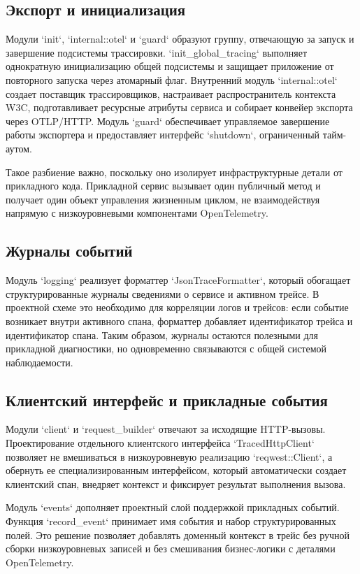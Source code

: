 \subsection{Экспорт и инициализация}

Модули `init`, `internal::otel` и `guard` образуют группу, отвечающую за запуск и
завершение подсистемы трассировки. `init_global_tracing` выполняет однократную
инициализацию общей подсистемы и защищает приложение от повторного запуска через
атомарный флаг. Внутренний модуль `internal::otel` создает поставщик
трассировщиков, настраивает распространитель контекста W3C, подготавливает
ресурсные атрибуты сервиса и собирает конвейер экспорта через OTLP/HTTP. Модуль
`guard` обеспечивает управляемое завершение работы экспортера и предоставляет
интерфейс `shutdown`, ограниченный тайм-аутом.

Такое разбиение важно, поскольку оно изолирует инфраструктурные детали от
прикладного кода. Прикладной сервис вызывает один публичный метод и получает один
объект управления жизненным циклом, не взаимодействуя напрямую с низкоуровневыми
компонентами OpenTelemetry.

\subsection{Журналы событий}

Модуль `logging` реализует форматтер `JsonTraceFormatter`, который обогащает
структурированные журналы сведениями о сервисе и активном трейсе. В проектной
схеме это необходимо для корреляции логов и трейсов: если событие возникает внутри
активного спана, форматтер добавляет идентификатор трейса и идентификатор спана.
Таким образом, журналы остаются полезными для прикладной диагностики, но
одновременно связываются с общей системой наблюдаемости.

\subsection{Клиентский интерфейс и прикладные события}

Модули `client` и `request_builder` отвечают за исходящие HTTP-вызовы.
Проектирование отдельного клиентского интерфейса `TracedHttpClient` позволяет не
вмешиваться в низкоуровневую реализацию `reqwest::Client`, а обернуть ее
специализированным интерфейсом, который автоматически создает клиентский спан,
внедряет контекст и фиксирует результат выполнения вызова.

Модуль `events` дополняет проектный слой поддержкой прикладных событий. Функция
`record_event` принимает имя события и набор структурированных полей. Это решение
позволяет добавлять доменный контекст в трейс без ручной сборки низкоуровневых
записей и без смешивания бизнес-логики с деталями OpenTelemetry.

